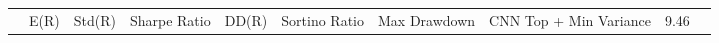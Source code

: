 \begin{tabular}{lrrrrrrrrr}
 & E(R) & Std(R) & Sharpe Ratio & DD(R) & Sortino Ratio & Max Drawdown & %
CNN Top + Min Variance & 9.46%
\end{tabular}
